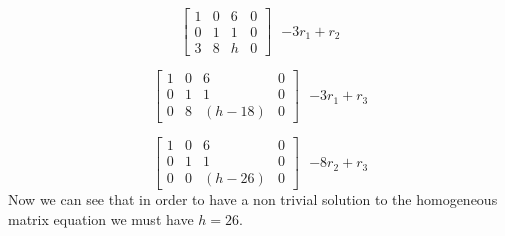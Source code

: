 \documentclass{amsart}
\begin{document}
\begin{equation}
\begin{bmatrix} 
1&0&6&0\\
0&1&1&0\\
3&8&h&0
\end{bmatrix}\text{ $-3r_{1}+r_{2}$}
\end{equation}

\begin{equation}
\begin{bmatrix} 
1&0&6&0\\
0&1&1&0\\
0&8&(h-18)&0
\end{bmatrix}\text{ $-3r_{1}+r_{3}$}
\end{equation}

\begin{equation}
\begin{bmatrix} 
1&0&6&0\\
0&1&1&0\\
0&0&(h-26)&0
\end{bmatrix}\text{ $-8r_{2}+r_{3}$}
\end{equation}
Now we can see that in order to have a non trivial solution to the homogeneous matrix equation we must have $h=26$.
\vspace{1in}
\end{document}
